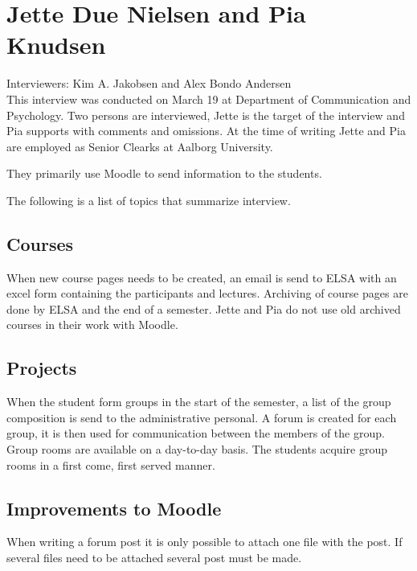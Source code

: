 \section{Jette Due Nielsen and Pia Knudsen}
\label{sec:jettePia}
Interviewers: Kim A. Jakobsen and Alex Bondo Andersen\\

This interview was conducted on March 19\ths{} at Department of Communication and Psychology.
Two persons are interviewed, Jette is the target of the interview and Pia supports with comments and omissions. 
At the time of writing Jette and Pia are employed as Senior Clearks at Aalborg University.

They primarily use Moodle to send information to the students. 

The following is a list of topics that summarize interview.

\subsection*{Courses}
When new course pages needs to be created, an email is send to ELSA with an excel form containing the participants and lectures.
Archiving of course pages are done by ELSA and the end of a semester. 
Jette and Pia do not use old archived courses in their work with Moodle.

\subsection*{Projects}
When the student form groups in the start of the semester, a list of the group composition is send to the administrative personal. 
A forum is created for each group, it is then used for communication between the members of the group.
Group rooms are available on a day-to-day basis.
The students acquire group rooms in a first come, first served manner.

\subsection*{Improvements to Moodle}
When writing a forum post it is only possible to attach one file with the post. 
If several files need to be attached several post must be made. 
